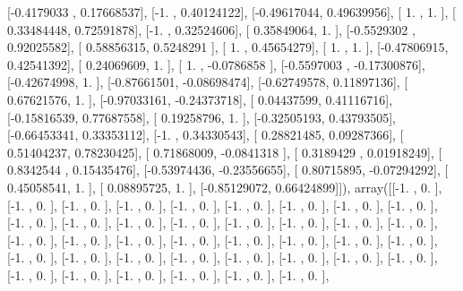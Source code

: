\documentclass{article}
\begin{document}
       [-0.4179033 ,  0.17668537],
       [-1.        ,  0.40124122],
       [-0.49617044,  0.49639956],
       [ 1.        ,  1.        ],
       [ 0.33484448,  0.72591878],
       [-1.        ,  0.32524606],
       [ 0.35849064,  1.        ],
       [-0.5529302 ,  0.92025582],
       [ 0.58856315,  0.5248291 ],
       [ 1.        ,  0.45654279],
       [ 1.        ,  1.        ],
       [-0.47806915,  0.42541392],
       [ 0.24069609,  1.        ],
       [ 1.        , -0.0786858 ],
       [-0.5597003 , -0.17300876],
       [-0.42674998,  1.        ],
       [-0.87661501, -0.08698474],
       [-0.62749578,  0.11897136],
       [ 0.67621576,  1.        ],
       [-0.97033161, -0.24373718],
       [ 0.04437599,  0.41116716],
       [-0.15816539,  0.77687558],
       [ 0.19258796,  1.        ],
       [-0.32505193,  0.43793505],
       [-0.66453341,  0.33353112],
       [-1.        ,  0.34330543],
       [ 0.28821485,  0.09287366],
       [ 0.51404237,  0.78230425],
       [ 0.71868009, -0.0841318 ],
       [ 0.3189429 ,  0.01918249],
       [ 0.8342544 ,  0.15435476],
       [-0.53974436, -0.23556655],
       [ 0.80715895, -0.07294292],
       [ 0.45058541,  1.        ],
       [ 0.08895725,  1.        ],
       [-0.85129072,  0.66424899]]), array([[-1.        ,  0.        ],
       [-1.        ,  0.        ],
       [-1.        ,  0.        ],
       [-1.        ,  0.        ],
       [-1.        ,  0.        ],
       [-1.        ,  0.        ],
       [-1.        ,  0.        ],
       [-1.        ,  0.        ],
       [-1.        ,  0.        ],
       [-1.        ,  0.        ],
       [-1.        ,  0.        ],
       [-1.        ,  0.        ],
       [-1.        ,  0.        ],
       [-1.        ,  0.        ],
       [-1.        ,  0.        ],
       [-1.        ,  0.        ],
       [-1.        ,  0.        ],
       [-1.        ,  0.        ],
       [-1.        ,  0.        ],
       [-1.        ,  0.        ],
       [-1.        ,  0.        ],
       [-1.        ,  0.        ],
       [-1.        ,  0.        ],
       [-1.        ,  0.        ],
       [-1.        ,  0.        ],
       [-1.        ,  0.        ],
       [-1.        ,  0.        ],
       [-1.        ,  0.        ],
       [-1.        ,  0.        ],
       [-1.        ,  0.        ],
       [-1.        ,  0.        ],
       [-1.        ,  0.        ],
       [-1.        ,  0.        ],
       [-1.        ,  0.        ],
       [-1.        ,  0.        ],
       [-1.        ,  0.        ],
       [-1.        ,  0.        ],
       [-1.        ,  0.        ],
       [-1.        ,  0.        ],
\end{document}
